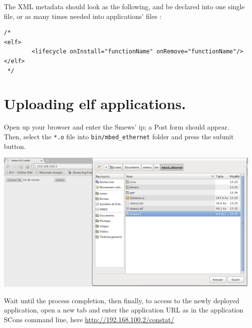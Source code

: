 \documentclass{report}
\begin{document}
The XML metadata should look as the following, and be declared into one single file, or as many times needed into applications' files :
\begin{lstlisting}
/*
<elf>
        <lifecycle onInstall="functionName" onRemove="functionName"/>
</elf>
 */
\end{lstlisting}

\section{Uploading elf applications.}
Open up your browser and enter the Smews' ip; a Post form should appear. Then, select the \verb+*.o+ file into \verb+bin/mbed_ethernet+ folder and press the submit button.
\begin{center}
\includegraphics[width=15cm]{elf_screenshot}
\end{center}



Wait until the process completion, then finally, to access to the newly deployed application, open a new tab and enter the application URL as in the application SCons command line, here \url{http://192.168.100.2/constat/}
\end{document}

